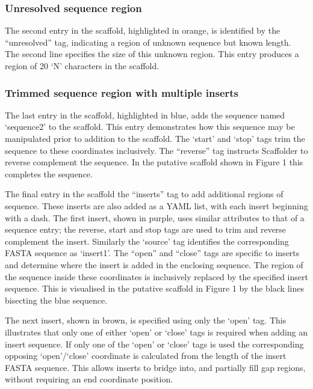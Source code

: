 \documentclass[10pt]{bmc_article}
\newenvironment{bmcformat}{\begin{raggedright}\baselineskip20pt\sloppy\setboolean{publ}{false}}{\end{raggedright}\baselineskip20pt\sloppy}
\begin{document}
\begin{bmcformat}
\subsubsection*{Unresolved sequence region} %

The second entry in the scaffold, highlighted in orange, is identified by the
``unresolved'' tag, indicating a region of unknown sequence but known length.
The second line specifies the size of this unknown region. This entry produces
a region of 20 `N' characters in the scaffold. \pb

\subsubsection*{Trimmed sequence region with multiple inserts} %

The last entry in the scaffold, highlighted in blue, adds the sequence named
`sequence2' to the scaffold. This entry demonstrates how this sequence may be
manipulated prior to addition to the scaffold. The `start' and `stop' tags
trim the sequence to these coordinates inclusively. The
``reverse'' tag  instructs Scaffolder to  reverse
complement the sequence. In the putative scaffold shown in Figure 1 this
completes the  sequence. \pb

The final entry in the scaffold  the ``inserts''
tag to add additional regions of sequence. These inserts are also added as
a YAML list, with each insert beginning with a dash. The first insert, shown
in purple, uses similar attributes to that of a sequence entry; the reverse,
start and stop tags are used to trim and reverse complement the insert.
Similarly the `source' tag identifies the corresponding FASTA sequence as
`insert1'. The ``open'' and ``close'' tags are specific to inserts and
determine where the insert is added in the enclosing sequence. The region of
the sequence inside these coordinates is inclusively replaced by the specified
insert sequence. This is visualised in the putative scaffold in Figure 1 by
the black lines bisecting the blue sequence. \pb

The next insert, shown in brown, is specified using only the `open' tag. This
illustrates that only one of either `open' or `close' tags is required when
adding an insert sequence. If only one of the `open' or `close' tags is used
the corresponding opposing `open'/`close' coordinate is calculated from the
length of the insert FASTA sequence. This allows inserts to bridge into, and
partially fill gap regions, without requiring an end coordinate position. \pb


\end{bmcformat}
\end{document}
